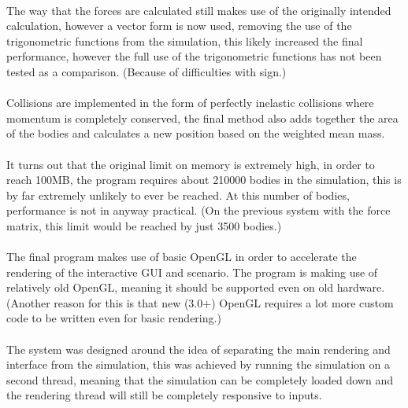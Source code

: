 \paragraph{}
The way that the forces are calculated still makes use of the originally intended calculation, however a vector form is now used, removing the use of the trigonometric functions from the simulation, this likely increased the final performance, however the full use of the trigonometric functions has not been tested as a comparison. (Because of difficulties with sign.)

\paragraph{}
Collisions are implemented in the form of perfectly inelastic collisions where momentum is completely conserved, the final method also adds together the area of the bodies and calculates a new position based on the weighted mean mass.

\paragraph{}
It turns out that the original limit on memory is extremely high, in order to reach 100MB, the program requires about 210000 bodies in the simulation, this is by far extremely unlikely to ever be reached. At this number of bodies, performance is not in anyway practical. (On the previous system with the force matrix, this limit would be reached by just 3500 bodies.)

\paragraph{}
The final program makes use of basic OpenGL in order to accelerate the rendering of the interactive GUI and scenario. The program is making use of relatively old OpenGL, meaning it should be supported even on old hardware. (Another reason for this is that new (3.0+) OpenGL requires a lot more custom code to be written even for basic rendering.)

\paragraph{}
The system was designed around the idea of separating the main rendering and interface from the simulation, this was achieved by running the simulation on a second thread, meaning that the simulation can be completely loaded down and the rendering thread will still be completely responsive to inputs.

